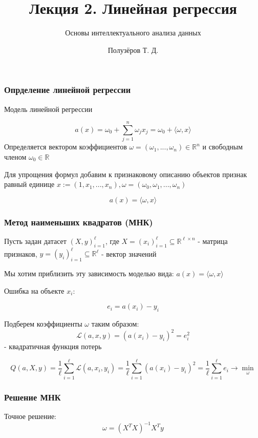 \documentclass{beamer}
\title{Лекция 2. Линейная регрессия}
\subtitle{Основы интеллектуального анализа данных}
\author{Полузёров Т. Д.}
\institute{БГУ ФПМИ}
\date{}
\begin{document}
	
	\begin{frame}
		\titlepage
	\end{frame}

		
	\begin{frame}
		\frametitle{Опрделение линейной регрессии}
		
		Модель линейной регрессии
		
		$$
		a(x) = \omega_0 + \sum_{j=1}^{n} \omega_j x_j = 
		\omega_0 + \langle \omega, x\rangle 
		$$
		Определяется вектором коэффициентов $\omega = (\omega_1, ..., \omega_n) \in \mathbb{R}^{n}$ и свободным членом $\omega_0 \in \mathbb{R}$
		
		\vspace{15}
		
		Для упрощения формул добавим к признаковому описанию объектов признак равный единице $x := (1, x_1, ..., x_n), \omega=(\omega_0, \omega_1, ..., \omega_{n})$
		
		$$
		a(x) = \langle \omega, x \rangle
		$$
		
	\end{frame}


	\begin{frame}
		\frametitle{Метод наименьших квадратов (МНК)}
		Пусть задан датасет $(X, y)_{i=1}^{\ell}$, где $X = (x_i)_{i=1}^{\ell} \subseteq \mathbb{R}^{\ell \times n}$ - матрица признаков, $y = (y_i)_{i=1}^{\ell}\subseteq \mathbb{R}^{\ell}$ - вектор значений
		
		Мы хотим приблизить эту зависимость моделью вида: $a(x) = \langle \omega, x \rangle$
		
		Ошибка на объекте $x_i$:
		
		$$
		e_i = a(x_i) - y_i
		$$
		
		Подберем коэффициенты $\omega$ таким образом:
		$$
		\mathcal{L}(a, x, y) = (a(x_i) - y_i)^{2} = e_i^{2}
		$$ - квадратичная функция потерь
		
		$$
		Q(a, X, y) 
		= \frac{1}{\ell} \sum_{i=1}^{\ell} \mathcal{L}(a, x_i, y_i)
		= \frac{1}{\ell} \sum_{i=1}^{\ell} (a(x_i) - y_i)^{2}
		= \frac{1}{\ell} \sum_{i=1}^{\ell} e_i
		\to \min_{\omega}
		$$
	\end{frame}

	\begin{frame}
		\frametitle{Решение МНК}
		Точное решение:
		$$
		\omega = (X^T X)^{-1} X^Ty
		$$
		
		
		
		
	\end{frame}
\end{document}
